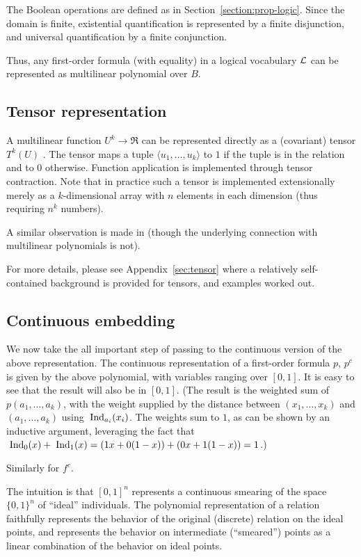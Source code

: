 \documentclass{article} %
\newcommand{\tuple}[1]{\(\langle #1\rangle\)}
\begin{document}
The Boolean operations are defined as in Section~\ref{section:prop-logic}. Since the domain is finite, existential quantification is represented by a finite disjunction, and universal quantification by a finite conjunction. 

Thus, any first-order formula (with equality) in a logical vocabulary \({\cal L}\) can be represented as multilinear polynomial over \(B\). 

\subsection{Tensor representation}
A multilinear function $U^k \rightarrow \Re$ can be represented directly as a (covariant) tensor $T^k(U)$ \cite[Chapter 8]{lee-book-2000}. The tensor maps a tuple \tuple{u_1,\ldots, u_k} to $1$ if the tuple is in the relation and to $0$ otherwise. Function application is implemented through tensor contraction. Note that in practice such a tensor is implemented extensionally merely as a \(k\)-dimensional array with \(n\) elements in each dimension (thus requiring \(n^k\) numbers). 

A similar observation is made in \cite{grefenstette-2013} (though the underlying connection with multilinear polynomials is not).

For more details, please see Appendix~\ref{sec:tensor} where a relatively self-contained background is provided for tensors, and examples worked out. 

\subsection{Continuous embedding}
We now take the all important step of passing to the continuous version of the above representation. 
The continuous representation of a first-order formula $p$, $p^c$ is given by the above polynomial, with
variables ranging over $[0,1]$. It is easy to see that the result will also be in $[0,1]$. (The result is the weighted sum of $p(a_1, \ldots, 
  a_k)$, with the weight supplied by the distance between $(x_1,
  \ldots, x_k)$ and $(a_1, \ldots, a_k)$ using $\;\mbox{Ind}_{a_i}(x_i)$. The
  weights sum to $1$, as can be shown by an inductive argument,
  leveraging the fact that $\;\mbox{Ind}_{0}(x) + \;\mbox{Ind}_{1}(x)=(1x+0(1-x))+(0x+1(1-x))=1$.)

Similarly for $f^c$. 

The intuition is that $[0,1]^n$ represents a continuous smearing of the space $\{0,1\}^n$ of ``ideal'' individuals. The polynomial representation of a relation faithfully represents the behavior of the original (discrete) relation on the ideal points, and represents the behavior on intermediate (``smeared'') points as a linear combination of the behavior on ideal points.
\end{document}
